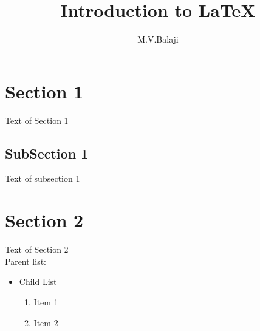 \documentclass{article}
\begin{document}
	\title{Introduction to \LaTeX{}}
	\author{M.V.Balaji}

	\maketitle

	\tableofcontents

	\section{Section 1}
	{\selectfont \Large Text of Section 1}
	\subsection{SubSection 1}
	Text of subsection 1
	\section{Section 2}
	{\selectfont \Huge Text of Section 2}
	\\Parent list:
	\begin{itemize}
		\item Child List
		\begin{enumerate}
			\item Item 1
			\item Item 2
		\end{enumerate}
	\end{itemize}
\end{document}
